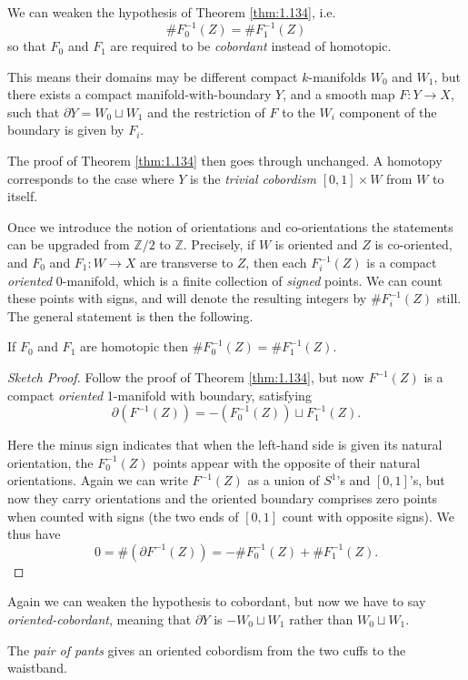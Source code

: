 \documentclass[a4paper,11pt]{article}
\begin{document}
	\begin{rmk}
		We can weaken the hypothesis of Theorem \ref{thm:1.134}, i.e.\ 
		\[
			\#F_0^{-1}(Z) = \#F_1^{-1}(Z)
		\]
		so that $F_0$ and $F_1$ are required to be \emph{cobordant} instead of homotopic.

		This means their domains may be different compact $k$-manifolds $W_0$ and $W_1$, but there exists a compact manifold-with-boundary $Y$, and a smooth map $F: Y \to X$, such that $\partial Y = W_0 \sqcup W_1$ and the restriction of $F$ to the $W_i$ component of the boundary is given by $F_i$.


		The proof of Theorem \ref{thm:1.134} then goes through unchanged. A homotopy corresponds to the case where $Y$ is the \emph{trivial cobordism} $[0,1]\times W$ from $W$ to itself.
	\end{rmk}

	Once we introduce the notion of orientations and co-orientations the statements can be upgraded from $\mathbb{Z}/2$ to $\mathbb{Z}$. Precisely, if $W$ is oriented and $Z$ is co-oriented, and $F_0$ and $F_1: W\to X$ are transverse to $Z$, then each $F_i^{-1}(Z)$ is a compact \emph{oriented} 0-manifold, which is a finite collection of \emph{signed} points. We can count these points with signs, and will denote the resulting integers by $\#F_i^{-1}(Z)$ still. The general statement is then the following.

	\begin{thm}
		If $F_0$ and $F_1$ are homotopic then $\#F_0^{-1}(Z) = \#F_1^{-1}(Z)$.
	\end{thm}

	\begin{proof}[Sketch Proof]
		Follow the proof of Theorem \ref{thm:1.134}, but now $F^{-1}(Z)$ is a compact \emph{oriented} 1-manifold with boundary, satisfying
		\[
			\partial(F^{-1}(Z)) = - (F_0^{-1}(Z))\sqcup F_1^{-1}(Z).
		\]
		
		Here the minus sign indicates that when the left-hand side is given its natural orientation, the $F_0^{-1}(Z)$ points appear with the opposite of their natural orientations. Again we can write $F^{-1}(Z)$ as a union of $S^1$'s and $[0,1]$'s, but now they carry orientations and the oriented boundary comprises zero points when counted with signs (the two ends of $[0,1]$ count with opposite signs). We thus have
		\[
			0 = \#(\partial F^{-1}(Z)) = - \# F_0^{-1}(Z) + \# F_1^{-1}(Z).
		\]
	\end{proof}

	\begin{rmk}
		Again we can weaken the hypothesis to cobordant, but now we have to say \emph{oriented-cobordant}, meaning that $\partial Y$ is $-W_0 \sqcup W_1$ rather than $W_0 \sqcup W_1$. 
	\end{rmk}

	\begin{ex}
		The \emph{pair of pants} gives an oriented cobordism from the two cuffs to the waistband.

	\end{ex}
\end{document}
